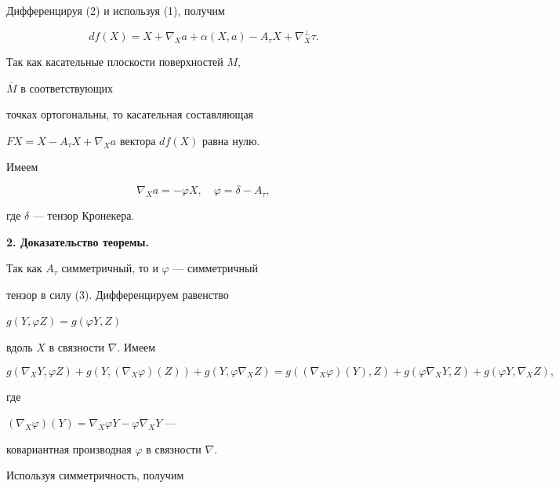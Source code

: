 Дифференцируя (2)  и используя (1), получим


$$


df(X)= X+\nabla _{X}a +\alpha (X,a) -


A_{\tau}X +  \nabla ^{\bot}_{X} \tau.


$$





Так как касательные плоскости поверхностей $M$,


$\overline {M}$ в соответствующих


точках ортогональны, то касательная составляющая


$FX=X-A_{\tau}X+\nabla _{X}a$ вектора $df(X)$ равна нулю.


Имеем





\begin{equation}


\nabla_{X}a =-\varphi X, \quad  \varphi =\delta-  A_{\tau},


\end{equation}


где $\delta$ --- тензор Кронекера.


\medskip





{\bf 2. Доказательство теоремы.}


Так как $A_{\tau}$ симметричный, то и $\varphi$ --- симметричный


тензор в силу (3). Дифференцируем равенство 


$g(Y,\varphi Z)= g(\varphi Y, Z)$


вдоль $X$ в связности $\nabla$. Имеем


$$


g(\nabla _{X}Y,\varphi Z)+g(Y,(\nabla _{X} \varphi)(Z))+


g(Y,\varphi \nabla _{X}Z)=g((\nabla _{X} \varphi )(Y),Z) +


g(\varphi \nabla _{X}Y,Z)+g(\varphi Y,\nabla _{X}Z),


$$


где 


$(\nabla_{X} \varphi )(Y)=\nabla _{X} \varphi Y -\varphi \nabla _{X}Y$ ---


ковариантная производная $\varphi$ в связности $\nabla$.


Используя симметричность, получим





